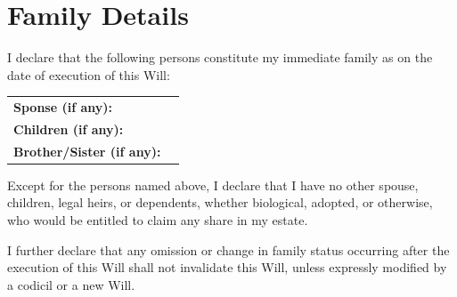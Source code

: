 
\section{Family Details}
\label{sec:family}

I declare that the following persons constitute my immediate family as on the date of execution of this Will:
\vspace{0.5 cm}

\noindent
\begin{tabular}{p{6cm} p{10cm}}
\textbf{Sponse (if any):} & \SpouseInfo{} \\ 
\textbf{Children (if any):} & \ChildrenInfo{} \\ 
\textbf{Brother/Sister (if any):} & \BrotherInfo{} \\ 
\end{tabular}

\vspace{0.3 cm}

\noindent Except for the persons named above, I declare that I have no other spouse, children, legal heirs, or dependents, whether biological, adopted, or otherwise, who would be entitled to claim any share in my estate. 

\vspace{0.3 cm}

\noindent I further declare that any omission or change in family status occurring after the execution of this Will shall not invalidate this Will, unless expressly modified by a codicil or a new Will.


